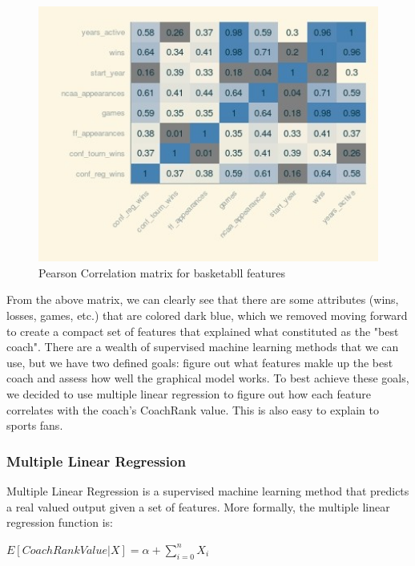 \documentclass[titlepage,12pt]{article}
\begin{document}
\begin{figure}[H]
      \caption{Pearson Correlation matrix for basketabll features}
      \centering
      \includegraphics[width=1.0\textwidth]{basketball_cor.jpg}
\end{figure}

\noindent From the above matrix, we can clearly see that there are some attributes (wins, losses, games, etc.) that are colored dark blue, which we removed moving forward to create a compact set of features that explained what constituted as the "best coach". There are a wealth of supervised machine learning methods that we can use, but we have two defined goals: figure out what features makle up the best coach and assess how well the graphical model works. To best achieve these goals, we decided to use multiple linear regression to figure out how each feature correlates with the coach's CoachRank value. This is also easy to explain to sports fans.

\subsubsection*{Multiple Linear Regression}

Multiple Linear Regression is a supervised machine learning method that predicts a real valued output given a set of features. More formally, the multiple linear regression function is:

\begin{center}
$E[CoachRankValue|X] = \alpha + \sum_{i=0}^{n} X_{i}$
\end{center}
\end{document}
